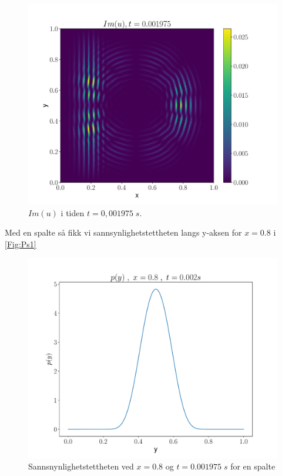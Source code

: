 \documentclass[reprint,english,notitlepage]{revtex4-2}  %
\begin{document}
\begin{figure}[H]
	\centering
	\includegraphics[scale=0.45, trim={3cm 0 0 0}]{../Images/ImshowIm0001975sl2.pdf}
	\caption{$Im(u) $ i tiden $t = 0,001975 \; s$.}
	\label{Fig:s2Imt02}
\end{figure}

Med en spalte så fikk vi sannsynlighetstettheten langs y-aksen for $x = 0.8$ i \autoref{Fig:Ps1}

\begin{figure}[H]
	\centering
	\includegraphics[scale=0.4]{../Images/ScreenProb1Slit.pdf}
	\caption{Sannsnynlighetstettheten ved $x = 0.8$ og $t = 0.001975 \; s$ for en spalte}
	\label{Fig:Ps1}
\end{figure}
\end{document}
